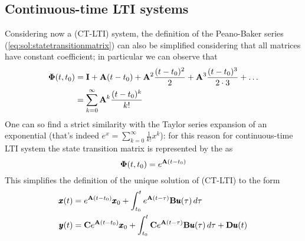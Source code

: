 \subsection*{Continuous-time LTI systems}
	Considering now a (CT-LTI) system, the definition of the Peano-Baker series (\ref{eq:sol:statetransitionmatrix}) can also be simplified considering that all matrices have constant coefficient; in particular we can observe that
	\begin{align*}
		\mathbf{\Phi}(t,t_0) & = \mathbf{I} + \mathbf{A}(t-t_0) + \mathbf{A}^2 \frac{(t - t_0)^2}{2} + \mathbf{A}^3 \frac{(t-t_0)^3}{2\cdot 3} + \dots \\ 
		& = \sum_{k=0}^\infty \mathbf{A}^k \frac{(t-t_0)^k}{k!}
	\end{align*}
	One can so find a strict similarity with the Taylor series expansion of an exponential (that's  indeed $e^x = \sum_{k=0}^\infty \frac 1{k!}x^k$): for this reason for continuous-time LTI system the state transition matrix is represented by the  as
	\begin{equation} \label{eq:sol:ctltiautonomous}
		\mathbf{\Phi}(t,t_0) = e^{\mathbf{A}(t-t_0)}
	\end{equation}
	This simplifies the definition of the unique solution of (CT-LTI) to the form
	\begin{equation}
	\begin{split}
		\pmb{x}(t) & = e^{\mathbf{A}(t-t_0)} \pmb{x}_0 + \int_{t_0}^t e^{\mathbf{A}(t-\tau)} \mathbf{B} \pmb{u}(\tau) \, d\tau \\ 
		\pmb{y}(t) & = \mathbf{C} e^{\mathbf{A}(t-t_0)} \pmb{x}_0 + \int_{t_0}^t \mathbf{C} e^{\mathbf{A}(t-\tau)} \mathbf{B} \pmb{u}(\tau) \, d\tau + \mathbf{D} \pmb{u}(t)
	\end{split}
	\end{equation}


